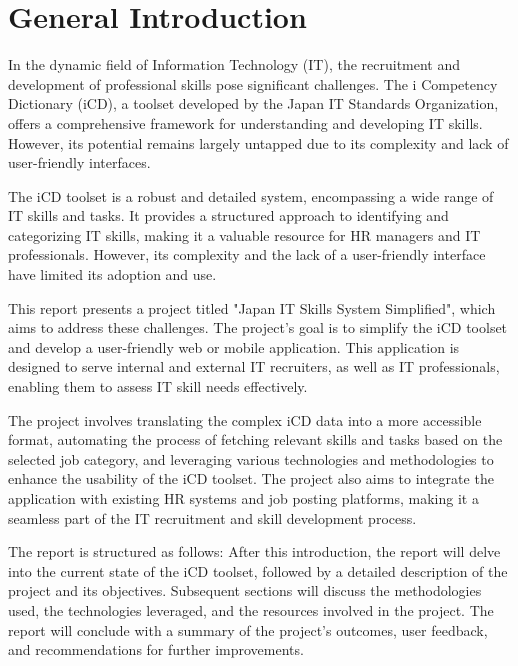 \thispagestyle{plain} %
\section*{General Introduction}
In the dynamic field of Information Technology (IT), the recruitment and development of professional skills pose significant challenges. The i Competency Dictionary (iCD), a toolset developed by the Japan IT Standards Organization, offers a comprehensive framework for understanding and developing IT skills. However, its potential remains largely untapped due to its complexity and lack of user-friendly interfaces.

The iCD toolset is a robust and detailed system, encompassing a wide range of IT skills and tasks. It provides a structured approach to identifying and categorizing IT skills, making it a valuable resource for HR managers and IT professionals. However, its complexity and the lack of a user-friendly interface have limited its adoption and use.

This report presents a project titled "Japan IT Skills System Simplified", which aims to address these challenges. The project's goal is to simplify the iCD toolset and develop a user-friendly web or mobile application. This application is designed to serve internal and external IT recruiters, as well as IT professionals, enabling them to assess IT skill needs effectively.

The project involves translating the complex iCD data into a more accessible format, automating the process of fetching relevant skills and tasks based on the selected job category, and leveraging various technologies and methodologies to enhance the usability of the iCD toolset. The project also aims to integrate the application with existing HR systems and job posting platforms, making it a seamless part of the IT recruitment and skill development process.

The report is structured as follows: After this introduction, the report will delve into the current state of the iCD toolset, followed by a detailed description of the project and its objectives. Subsequent sections will discuss the methodologies used, the technologies leveraged, and the resources involved in the project. The report will conclude with a summary of the project's outcomes, user feedback, and recommendations for further improvements.

\newpage

